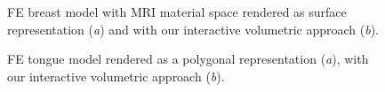 \documentclass[review,journal]{vgtc}         %
\begin{document}
\begin{figure}[t]
    \centering 
    \caption{FE breast model with MRI material space rendered as surface representation ({\it a}) and with our interactive volumetric approach ({\it b}).}
    \label{fig:breast}
\end{figure}

\begin{figure}[b]
    \centering 
    \caption{FE tongue model rendered as a polygonal representation ({\it a}), with our interactive volumetric approach ({\it b}).}
    \label{fig:tongue}
\end{figure}
\end{document}

